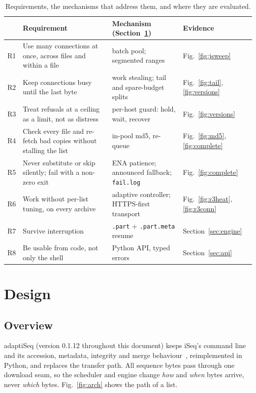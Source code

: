 \documentclass[11pt,a4paper]{article}
\newcommand{\code}[1]{\texttt{#1}}
\newcommand{\figref}[1]{Fig.~\ref{#1}}
\newcommand{\secref}[1]{Section~\ref{#1}}
\begin{document}
\begin{table}[h]
\centering\small
\begin{tabularx}{\linewidth}{@{}l X X l@{}}
\toprule
 & Requirement & Mechanism (\secref{sec:design}) & Evidence \\
\midrule
R1 & Use many connections at once, across files and within a file & batch pool; segmented ranges & \figref{fig:jsweep} \\
R2 & Keep connections busy until the last byte & work stealing; tail and spare-budget splits & \figref{fig:tail}, \ref{fig:versions} \\
R3 & Treat refusals at a ceiling as a limit, not as distress & per-host guard: hold, wait, recover & \figref{fig:versions} \\
R4 & Check every file and re-fetch bad copies without stalling the list & in-pool md5, re-queue & \figref{fig:md5}, \ref{fig:complete} \\
R5 & Never substitute or skip silently; fail with a non-zero exit & ENA patience; announced fallback; \code{fail.log} & \figref{fig:complete} \\
R6 & Work without per-list tuning, on every archive & adaptive controller; HTTPS-first transport & \figref{fig:r3heat}, \ref{fig:r3conn} \\
R7 & Survive interruption & \code{.part} + \code{.part.meta} resume & \secref{sec:engine} \\
R8 & Be usable from code, not only the shell & Python API, typed errors & \secref{sec:api} \\
\bottomrule
\end{tabularx}
\caption{Requirements, the mechanisms that address them, and where they are evaluated.}
\label{tab:req}
\end{table}

\section{Design}
\label{sec:design}

\subsection{Overview}
adaptiSeq (version 0.1.12 throughout this document) keeps iSeq's command line and its accession, metadata,
integrity and merge behaviour~\cite{iseq}, reimplemented in Python, and replaces the transfer path. All sequence
bytes pass through one download seam, so the scheduler and engine change \emph{how} and \emph{when} bytes arrive,
never \emph{which} bytes. \figref{fig:arch} shows the path of a list.
\end{document}
